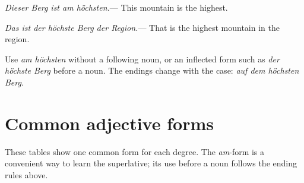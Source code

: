 \begin{tcolorbox}[colback=referenceYellowBg,colframe=genderPlural,title={Two useful superlative patterns},fonttitle=\bfseries]
\textit{Dieser Berg ist am höchsten.}\quad--- This mountain is the highest.\par
\textit{Das ist der höchste Berg der Region.}\quad--- That is the highest mountain in the region.\par
Use \textit{am höchsten} without a following noun, or an inflected form
such as \textit{der höchste Berg} before a noun. The endings change with the
case: \textit{auf dem höchsten Berg}.
\end{tcolorbox}

\section{Common adjective forms}

These tables show one common form for each degree. The \textit{am}-form
is a convenient way to learn the superlative; its use before a noun follows
the ending rules above.

